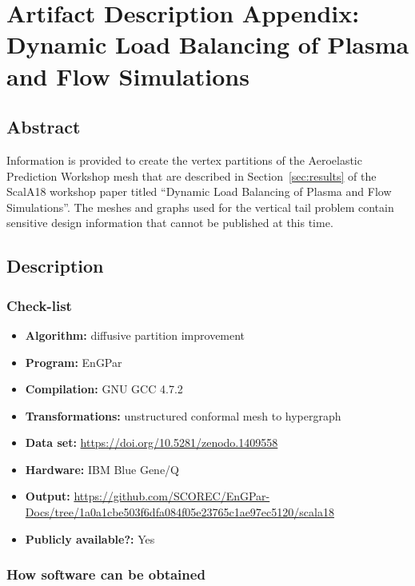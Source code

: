 \appendices

\section{Artifact Description Appendix: 
Dynamic Load Balancing of Plasma and Flow Simulations}

\subsection{Abstract}

Information is provided to create the vertex partitions of the Aeroelastic
Prediction Workshop mesh that are described in Section~\ref{sec:results} of the ScalA18
workshop paper titled ``Dynamic Load Balancing of Plasma and Flow Simulations''.
The meshes and graphs used for the vertical tail problem contain sensitive
design information that cannot be published at this time.

\subsection{Description}

\subsubsection{Check-list}

{\small
\begin{itemize}
  \item {\bf Algorithm: } diffusive partition improvement
  \item {\bf Program: } EnGPar
  \item {\bf Compilation: } GNU GCC 4.7.2
  \item {\bf Transformations: } unstructured conformal mesh to hypergraph
  \item {\bf Data set: } \url{https://doi.org/10.5281/zenodo.1409558}
  \item {\bf Hardware: } IBM Blue Gene/Q
  \item {\bf Output: } \url{https://github.com/SCOREC/EnGPar-Docs/tree/1a0a1cbe503f6dfa084f05e23765c1ae97ec5120/scala18}
  \item {\bf Publicly available?: } Yes
\end{itemize}
}

\subsubsection{How software can be obtained}

